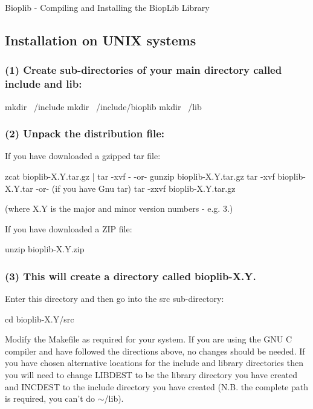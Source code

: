 Bioplib -\/ Compiling and Installing the Biop\-Lib Library

\subsection*{Installation on U\-N\-I\-X systems }

\subsubsection*{(1) Create sub-\/directories of your main directory called include and lib\-:}

\begin{DoxyVerb}     mkdir ~/include
     mkdir ~/include/bioplib
     mkdir ~/lib
\end{DoxyVerb}


\subsubsection*{(2) Unpack the distribution file\-:}

If you have downloaded a gzipped tar file\-: \begin{DoxyVerb}        zcat bioplib-X.Y.tar.gz | tar -xvf -
     -or-
        gunzip bioplib-X.Y.tar.gz
        tar -xvf bioplib-X.Y.tar
     -or- (if you have Gnu tar)
        tar -zxvf bioplib-X.Y.tar.gz
\end{DoxyVerb}


(where X.\-Y is the major and minor version numbers -\/ e.\-g. 3.)

If you have downloaded a Z\-I\-P file\-: \begin{DoxyVerb}     unzip bioplib-X.Y.zip
\end{DoxyVerb}


\subsubsection*{(3) This will create a directory called bioplib-\/\-X.\-Y.}

Enter this directory and then go into the src sub-\/directory\-: \begin{DoxyVerb}     cd bioplib-X.Y/src
\end{DoxyVerb}


Modify the Makefile as required for your system. If you are using the G\-N\-U C compiler and have followed the directions above, no changes should be needed. If you have chosen alternative locations for the include and library directories then you will need to change L\-I\-B\-D\-E\-S\-T to be the library directory you have created and I\-N\-C\-D\-E\-S\-T to the include directory you have created (N.\-B. the complete path is required, you can't do $\sim$/lib).

